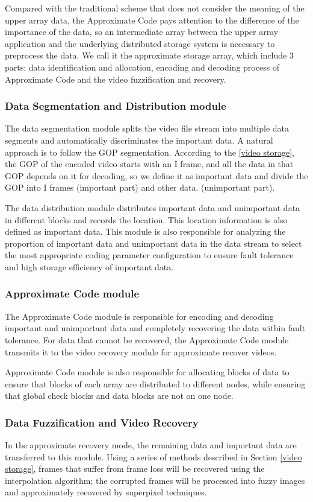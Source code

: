 \documentclass[sigconf]{acmart}
\begin{document}
Compared with the traditional scheme that does not consider the meaning of the upper array data, the Approximate Code pays attention to the difference of the importance of the data, so an intermediate array between the upper array application and the underlying distributed storage system is necessary to preprocess the data. We call it the approximate storage array, which include 3 parts: data identification and allocation, encoding and decoding process of Approximate Code and the video fuzzification and recovery.

\subsubsection{Data Segmentation and Distribution module}
The data segmentation module splits the video file stream into multiple data segments and automatically discriminates the important data. A natural approach is to follow the GOP segmentation. According to the \ref{video storage}, the GOP of the encoded video starts with an I frame, and all the data in that GOP depends on it for decoding, so we define it as important data and divide the GOP into I frames (important part) and other data. (unimportant part).

The data distribution module distributes important data and unimportant data in different blocks and records the location. This location information is also defined as important data. This module is also responsible for analyzing the proportion of important data and unimportant data in the data stream to select the most appropriate coding parameter configuration to ensure fault tolerance and high storage efficiency of important data.

\subsubsection{Approximate Code module}
The Approximate Code module is responsible for encoding and decoding important and unimportant data and completely recovering the data within fault tolerance. For data that cannot be recovered, the Approximate Code module transmits it to the video recovery module for approximate recover videos.

Approximate Code module is also responsible for allocating blocks of data to ensure that blocks of each array are distributed to different nodes, while ensuring that global check blocks and data blocks are not on one node.

\subsubsection{Data Fuzzification and Video Recovery}
In the approximate recovery mode, the remaining data and important data are transferred to this module. Using a series of methods described in Section \ref{video storage}, frames that suffer from frame loss will be recovered using the interpolation algorithm; the corrupted frames will be processed into fuzzy images and approximately recovered by superpixel techniques.
\end{document}
